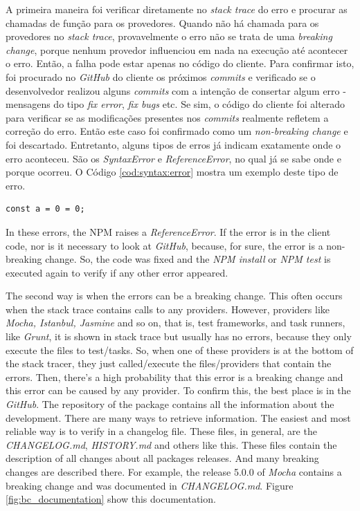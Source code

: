 A primeira maneira foi verificar diretamente no \textit{stack trace} do erro e procurar as chamadas de função para os provedores. Quando não há chamada para os provedores no \textit{stack trace}, provavelmente o erro não se trata de uma \textit{breaking change}, porque nenhum provedor influenciou em nada na execução até acontecer o erro. Então, a falha pode estar apenas no código do cliente. Para confirmar isto, foi procurado no \textit{GitHub} do cliente os próximos \textit{commits} e verificado se o desenvolvedor realizou alguns \textit{commits} com a intenção de consertar algum erro - mensagens do tipo \textit{fix error}, \textit{fix bugs} etc. Se sim, o código do cliente foi alterado para verificar se as modificações presentes nos \textit{commits} realmente refletem a correção do erro. Então este caso foi confirmado como um \textit{non-breaking change} e foi descartado. Entretanto, alguns tipos de erros já indicam exatamente onde o erro aconteceu. São os \textit{SyntaxError} e \textit{ReferenceError}, no qual já se sabe onde e porque ocorreu. O Código \ref{cod:syntax:error} mostra um exemplo deste tipo de erro.

\begin{lstlisting}[style=Javascript, label=cod:syntax:error, caption={Código com um Reference Error}]
const a = 0 = 0;
\end{lstlisting}

In these errors, the \Gls{NPM} raises a \textit{ReferenceError}. If the error is in the client code, nor is it necessary to look at \textit{GitHub}, because, for sure, the error is a non-breaking change. So, the code was fixed and the \textit{\Gls{NPM} install} or \textit{\Gls{NPM} test} is executed again to verify if any other error appeared.

The second way is when the errors can be a breaking change. This often occurs when the stack trace contains calls to any providers. However, providers like \textit{Mocha, Istanbul, Jasmine} and so on, that is, test frameworks, and task runners, like \textit{Grunt}, it is shown in stack trace but usually has no errors, because they only execute the files to test/tasks. So, when one of these providers is at the bottom of the stack tracer, they just called/execute the files/providers that contain the errors. Then, there’s a high probability that this error is a breaking change and this error can be caused by any provider.
To confirm this, the best place is in the \textit{GitHub}. The repository of the package contains all the information about the development. There are many ways to retrieve information. The easiest and most reliable way is to verify in a changelog file. These files, in general, are the \textit{CHANGELOG.md}, \textit{HISTORY.md} and others like this. These files contain the description of all changes about all packages releases. And many breaking changes are described there. For example, the release 5.0.0 of \textit{Mocha} contains a breaking change and was documented in \textit{CHANGELOG.md}. Figure \ref{fig:bc_documentation} show this documentation.

